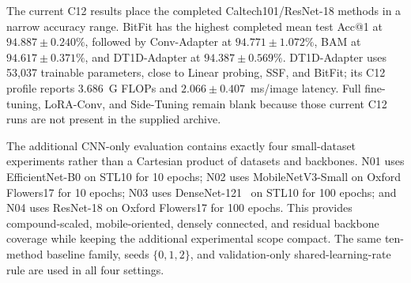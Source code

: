 \documentclass[pdflatex,sn-mathphys-num]{sn-jnl}
\theoremstyle{thmstyleone}
\theoremstyle{thmstyletwo}
\theoremstyle{thmstylethree}
\begin{document}
The current C12 results place the completed Caltech101/ResNet-18 methods in a narrow accuracy range. BitFit has the highest completed mean test Acc@1 at $94.887\pm0.240\%$, followed by Conv-Adapter at $94.771\pm1.072\%$, BAM at $94.617\pm0.371\%$, and DT1D-Adapter at $94.387\pm0.569\%$. DT1D-Adapter uses 53,037 trainable parameters, close to Linear probing, SSF, and BitFit; its C12 profile reports 3.686~G FLOPs and $2.066\pm0.407$~ms/image latency. Full fine-tuning, LoRA-Conv, and Side-Tuning remain blank because those current C12 runs are not present in the supplied archive.

\FloatBarrier

The additional CNN-only evaluation contains exactly four small-dataset experiments rather than a Cartesian product of datasets and backbones. N01 uses EfficientNet-B0 on STL10 for 10 epochs; N02 uses MobileNetV3-Small on Oxford Flowers17 for 10 epochs; N03 uses DenseNet-121~\cite{huang2017densenet} on STL10 for 100 epochs; and N04 uses ResNet-18 on Oxford Flowers17 for 100 epochs. This provides compound-scaled, mobile-oriented, densely connected, and residual backbone coverage while keeping the additional experimental scope compact. The same ten-method baseline family, seeds $\{0,1,2\}$, and validation-only shared-learning-rate rule are used in all four settings.
\end{document}
